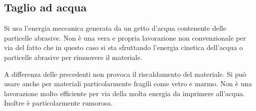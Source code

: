 \subsection{Taglio ad acqua}
Si usa l'energia meccanica generata da un getto d'acqua contenente delle particelle abrasive.
Non è una vera e propria lavorazione non convenzionale per via del fatto che in questo caso si sta sfruttando l'energia cinetica dell'acqua o particelle abrasive per rimuovere il materiale.

A differenza delle precedenti non provoca il riscaldamento del materiale.
Si può usare anche per materiali particolarmente fragili come vetro e marmo.
Non è una lavorazione molto efficiente per via della molta energia da imprimere all'acqua. Inoltre è particolarmente rumorosa.